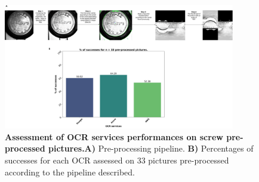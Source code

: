 \documentclass[12pt, french, a4paper]{article} %
\begin{document}
\begin{figure}[H]
 \centering
 \includegraphics[width=0.9\textwidth]{figure/screw_pipeline.jpg}
 \caption{\textbf{Assessment of OCR services performances on screw pre-processed pictures.}\textbf{A)} Pre-processing pipeline. \textbf{B)} Percentages of successes for each \gls{OCR} assessed on 33 pictures pre-processed according to the pipeline described. }
 \label{screw_pipeline}
\end{figure}
\end{document}
